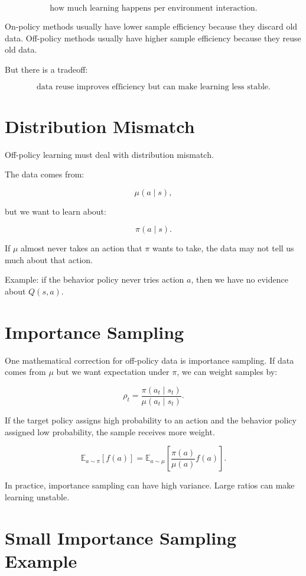 \documentclass[11pt]{article}
\begin{document}
\[
\text{how much learning happens per environment interaction}.
\]

On-policy methods usually have lower sample efficiency because they discard old data.
Off-policy methods usually have higher sample efficiency because they reuse old data.

But there is a tradeoff:

\[
\boxed{
\text{data reuse improves efficiency but can make learning less stable.}
}
\]

\section{Distribution Mismatch}

Off-policy learning must deal with distribution mismatch.

The data comes from:

\[
\mu(a \mid s),
\]

but we want to learn about:

\[
\pi(a \mid s).
\]

If $\mu$ almost never takes an action that $\pi$ wants to take, the data may not tell us much about that action.

Example:
if the behavior policy never tries action $a$, then we have no evidence about $Q(s,a)$.

\section{Importance Sampling}

One mathematical correction for off-policy data is importance sampling.
If data comes from $\mu$ but we want expectation under $\pi$, we can weight samples by:

\[
\rho_t
=
\frac{\pi(a_t \mid s_t)}{\mu(a_t \mid s_t)}.
\]

If the target policy assigns high probability to an action and the behavior policy assigned low probability, the sample receives more weight.

\[
\mathbb{E}_{a \sim \pi}[f(a)]
=
\mathbb{E}_{a \sim \mu}
\left[
\frac{\pi(a)}{\mu(a)}f(a)
\right].
\]

In practice, importance sampling can have high variance.
Large ratios can make learning unstable.

\section{Small Importance Sampling Example}
\end{document}

